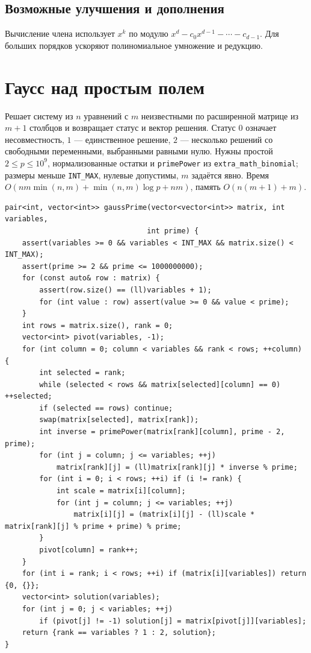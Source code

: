 \subsection*{Возможные улучшения и дополнения}
Вычисление члена использует $x^k$ по модулю
$x^d-c_0x^{d-1}-\cdots-c_{d-1}$.
Для больших порядков ускоряют полиномиальное умножение и редукцию.


\fi
\section{Гаусс над простым полем}
Решает систему из $n$ уравнений с $m$ неизвестными по расширенной матрице из $m+1$ столбцов и возвращает статус и вектор решения.
Статус $0$ означает несовместность, $1$ --- единственное решение, $2$ --- несколько решений со свободными переменными, выбранными равными нулю.
Нужны простой $2\le p\le10^9$, нормализованные остатки и \texttt{primePower} из \texttt{extra\_math\_binomial}; размеры меньше \texttt{INT\_MAX}, нулевые допустимы, $m$ задаётся явно.
Время $O(nm\min(n,m)+\min(n,m)\log p+nm)$, память $O(n(m+1)+m)$.
\begin{lstlisting}[name=extra_math_gauss_prime]
pair<int, vector<int>> gaussPrime(vector<vector<int>> matrix, int variables,
                                 int prime) {
    assert(variables >= 0 && variables < INT_MAX && matrix.size() < INT_MAX);
    assert(prime >= 2 && prime <= 1000000000);
    for (const auto& row : matrix) {
        assert(row.size() == (ll)variables + 1);
        for (int value : row) assert(value >= 0 && value < prime);
    }
    int rows = matrix.size(), rank = 0;
    vector<int> pivot(variables, -1);
    for (int column = 0; column < variables && rank < rows; ++column) {
        int selected = rank;
        while (selected < rows && matrix[selected][column] == 0) ++selected;
        if (selected == rows) continue;
        swap(matrix[selected], matrix[rank]);
        int inverse = primePower(matrix[rank][column], prime - 2, prime);
        for (int j = column; j <= variables; ++j)
            matrix[rank][j] = (ll)matrix[rank][j] * inverse % prime;
        for (int i = 0; i < rows; ++i) if (i != rank) {
            int scale = matrix[i][column];
            for (int j = column; j <= variables; ++j)
                matrix[i][j] = (matrix[i][j] - (ll)scale * matrix[rank][j] % prime + prime) % prime;
        }
        pivot[column] = rank++;
    }
    for (int i = rank; i < rows; ++i) if (matrix[i][variables]) return {0, {}};
    vector<int> solution(variables);
    for (int j = 0; j < variables; ++j)
        if (pivot[j] != -1) solution[j] = matrix[pivot[j]][variables];
    return {rank == variables ? 1 : 2, solution};
}
\end{lstlisting}
